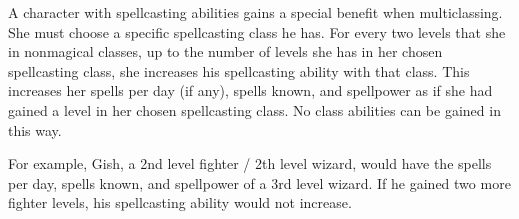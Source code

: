         A character with spellcasting abilities gains a special benefit when multiclassing.
        She must choose a specific spellcasting class he has.
        For every two levels that she in nonmagical classes, up to the number of levels she has in her chosen spellcasting class, she increases his spellcasting ability with that class.
        This increases her spells per day (if any), spells known, and spellpower as if she had gained a level in her chosen spellcasting class.
        No class abilities can be gained in this way.

        For example, Gish, a 2nd level fighter / 2th level wizard, would have the spells per day, spells known, and spellpower of a 3rd level wizard.
        If he gained two more fighter levels, his spellcasting ability would not increase.
